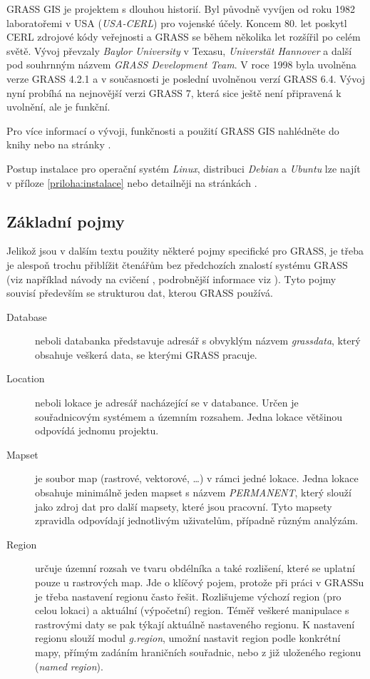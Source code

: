 \documentclass[a4paper,12pt,draft]{article}
\begin{document}
{GRASS GIS je projektem s dlouhou historií. Byl původně vyvíjen od roku
1982 laboratořemi v USA (\emph{USA-CERL}) pro vojenské účely. Koncem
80. let poskytl CERL zdrojové kódy veřejnosti a GRASS se během několika
let rozšířil po celém světě. Vývoj převzaly \emph{Baylor University}
v Texasu, \emph{Universtät Hannover} a další pod souhrnným názvem
\emph{GRASS Development Team}. V roce 1998 byla uvolněna verze GRASS
4.2.1 a v současnosti je poslední uvolněnou verzí GRASS 6.4. Vývoj
nyní probíhá na nejnovější verzi GRASS 7, která sice ještě není
připravená k uvolnění, ale je funkční.

Pro více informací o vývoji, funkčnosti a použití GRASS GIS nahlédněte
do knihy \cite{grass_gis} nebo na stránky \cite{grass_page}.

Postup instalace pro operační systém \emph{Linux}, distribuci \emph{Debian} a
\emph{Ubuntu} lze najít v příloze \ref{priloha:instalace} nebo detailněji na
stránkách \cite{instalace}.

\subsection{Základní pojmy}
\label{sec:grass:pojmy}
Jelikož jsou v dalším textu použity některé pojmy specifické pro GRASS,
je třeba je alespoň trochu přiblížit čtenářům bez předchozích
znalostí systému GRASS (viz například návody na cvičení \cite{YZOD},
podrobnější informace viz \cite{grass_gis}). Tyto pojmy souvisí především se
strukturou dat,
kterou GRASS používá.

\begin{description}
\item[Database] neboli databanka představuje adresář s obvyklým názvem
\emph{grassdata}, který obsahuje veškerá data, se kterými GRASS pracuje.
\item [Location] neboli lokace je adresář nacházející se v
databance. Určen je souřadnicovým systémem a územním rozsahem. Jedna
lokace většinou odpovídá jednomu projektu.
\item [Mapset] je soubor map (rastrové, vektorové, \ldots) v rámci
jedné lokace. Jedna lokace obsahuje minimálně jeden mapset s názvem
\emph{PERMANENT}, který  slouží jako zdroj dat pro další mapsety, které jsou
pracovní. Tyto mapsety zpravidla odpovídají jednotlivým uživatelům,
případně různým analýzám.
\item [Region] určuje územní rozsah ve tvaru obdélníka a také
rozlišení, které se uplatní pouze u rastrových map. Jde o klíčový
pojem, protože při práci v GRASSu je třeba nastavení regionu často
řešit.  Rozlišujeme výchozí region (pro celou lokaci) a aktuální
(výpočetní) region. Téměř veškeré manipulace s rastrovými daty se pak
týkají aktuálně nastaveného regionu. K nastavení regionu slouží
modul \emph{g.region}, umožní nastavit region podle konkrétní mapy,
přímým zadáním hraničních souřadnic, nebo z již uloženého regionu
(\emph{named region}).
 \end{description}



}
\end{document}
